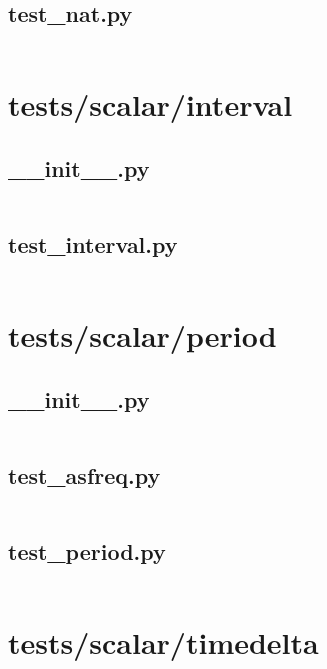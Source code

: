 \documentclass{article}
\begin{document}
\subsection{test\_nat.py}
\inputminted{python}{/home/dufferzafar/dev/@clones/pandas/pandas/tests/scalar/test_nat.py}
\newpage

\section{tests/scalar/interval}

\subsection{\_\_init\_\_.py}
\inputminted{python}{/home/dufferzafar/dev/@clones/pandas/pandas/tests/scalar/interval/__init__.py}
\newpage

\subsection{test\_interval.py}
\inputminted{python}{/home/dufferzafar/dev/@clones/pandas/pandas/tests/scalar/interval/test_interval.py}
\newpage

\section{tests/scalar/period}

\subsection{\_\_init\_\_.py}
\inputminted{python}{/home/dufferzafar/dev/@clones/pandas/pandas/tests/scalar/period/__init__.py}
\newpage

\subsection{test\_asfreq.py}
\inputminted{python}{/home/dufferzafar/dev/@clones/pandas/pandas/tests/scalar/period/test_asfreq.py}
\newpage

\subsection{test\_period.py}
\inputminted{python}{/home/dufferzafar/dev/@clones/pandas/pandas/tests/scalar/period/test_period.py}
\newpage

\section{tests/scalar/timedelta}
\end{document}
